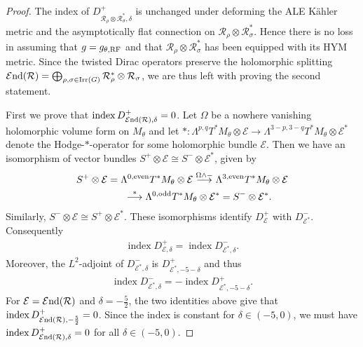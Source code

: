 \documentclass[pdftex]{sigma}
\numberwithin{equation}{section}
\newcommand{\cE}{\mathcal{E}}
\newcommand{\cR}{\mathcal{R}}
\newcommand{\Irr}{\operatorname{Irr}}
\newcommand{\cEnd}{\cE{\rm nd}}
\newcommand{\ind}{\mathop{\mathrm{index}}}
\newcommand{\iso}{\cong}
\newcommand{\RF}{{\rm RF}}
\begin{document}
\begin{proof}
  The index of $D^{+}_{\cR_{\rho}\otimes \cR_{\sigma}^*, \delta}$ is
  unchanged under deforming the ALE K\"ahler metric and the
  asymptotically f\/lat connection on $\cR_\rho\otimes\cR_\sigma^*$.
  Hence there is no loss in assuming that $g=g_{\theta,\RF}$ and that
  $\cR_\rho\otimes\cR_\sigma^*$ has been equipped with its HYM metric.
  Since the twisted Dirac operators preserve the holomorphic splitting
  $\cEnd(\cR) = \bigoplus_{\rho,\sigma\in \Irr(G)}\cR_{\rho}^*\otimes
  \cR_{\sigma}$, we are thus left with proving the second statement.

  First we prove that $\ind D^+_{\cEnd(\cR),\delta}=0$.  Let $\Omega$
  be a nowhere vanishing holomorphic volume form on $M_\theta$ and let
  $*\colon \Lambda^{p,q} T^*M_\theta \otimes \cE \to \Lambda^{3-p,3-q}
  T^*M_\theta \otimes \cE^*$ denote the Hodge-$*$-operator for some
  holomorphic bundle $\cE$.  Then we have an isomorphism of vector
  bundles $S^{+} \otimes \cE \iso S^{-} \otimes \cE^*$, given by
  \begin{gather*}
    S^+\otimes \cE=\Lambda^{0,\text{even}} T^*M_\theta\otimes \cE
    \stackrel{\Omega\wedge -}{\longrightarrow} \Lambda^{3,{\rm even}}
    T^*M_\theta \otimes \cE \\
\hphantom{S^+\otimes \cE}{}
    \stackrel{*}{\longrightarrow}
    \Lambda^{0,{\rm odd}} T^*M_\theta \otimes \cE^* = S^-\otimes
    \cE^*.
  \end{gather*}
  Similarly, $S^-\otimes \cE \iso S^+\otimes \cE^*$.  These
  isomorphisms identify $D^+_\cE$ with $D^-_{\cE^*}$.  Consequently
  \begin{gather*}%
    \ind D^+_{\cE,\delta}
    =\ind D^-_{\cE^*,\delta}.
  \end{gather*}
  Moreover, the $L^2$-adjoint of $D^{-}_{\cE^*, \delta}$ is
  $D^{+}_{\cE^*,-5-\delta}$ and thus
 \begin{gather*}%
   \ind D^{-}_{\cE^*,\delta} = - \ind D^{+}_{\cE^*, -5-\delta}.
 \end{gather*}
 For $\cE = \cEnd(\cR)$ and $\delta=-\frac52$, the two identities
 above give that $\ind D^+_{\cEnd(\cR),-\frac{5}{2}}=0$.  Since the
 index is constant for $\delta \in (-5, 0)$, we must have $\ind
 D^+_{\cEnd(\cR),\delta}=0$ for all $\delta \in (-5, 0)$.


\end{proof}
\end{document}
